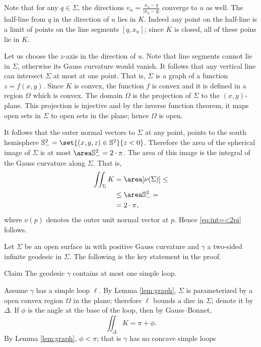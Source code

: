 Note that for any $q\in \Sigma$, the directions $v_n=\tfrac{x_n-q}{|x_n-q|}$ converge to $u$ as well.
The half-line from $q$ in the direction of $u$ lies in $K$.
Indeed any point on the half-line is a limit of points on the line segments $[q,x_n]$;
since $K$ is closed, all of these poins lie in $K$.


Let us choose the $z$-axis in the direction of $u$.
Note that line segments cannot lie in $\Sigma$, otherwise its Gauss curvature would vanish.
It follows that any vertical line can intersect $\Sigma$ at most at one point.
That is, $\Sigma$ is a graph of a function $z=f(x,y)$.
Since $K$ is convex, the function $f$ is convex and it is defined in a region $\Omega$ which is convex.
The domain $\Omega$ is the projection of $\Sigma$ to the $(x,y)$-plane.
This projection is injective and by the inverse function theorem, it maps open sets in $\Sigma$ to open sets in the plane;
hence $\Omega$ is open.

It follows that the outer normal vectors to $\Sigma$ at any point, points to the south hemisphere $\mathbb{S}^2_-=\set{(x,y,z)\in\mathbb{S}^2}{z< 0}$.
Therefore the area of the spherical image of $\Sigma$ is at most $\area\mathbb{S}^2_-= 2\cdot\pi$.
The area of this image is the integral of the Gauss curvature along $\Sigma$.
That is,
\begin{align*}
\iint_{\Sigma}K&=\area[\nu(\Sigma)]\le 
\\
&\le \area\mathbb{S}^2_-=
\\
&=2\cdot\pi,
\end{align*}
where $\nu(p)$ denotes the outer unit normal vector at $p$.
Hence \ref{eq:int=<2pi} follows.
\qeds

Let $\Sigma$ be an open surface in with positive Gauss curvature and $\gamma$ a two-sided infinite geodesic in $\Sigma$.
The following is the key statement in the proof.

\begin{thm}{Claim}
The geodesic $\gamma$ contains at most one simple loop.
\end{thm}

Assume $\gamma$ has a simple loop $\ell$.
By Lemma \ref{lem:graph}, $\Sigma$ is parameterized by a open convex region $\Omega$ in the plane;
therefore $\ell$ bounds a disc in $\Sigma$; denote it by $\Delta$.
If $\phi$ is the angle at the base of the loop, then by Gauss--Bonnet,
\[\iint_\Delta K=\pi+\phi.\] 
By Lemma \ref{lem:graph}, $\phi<\pi$; that is $\gamma$ has no concave simple loops 

